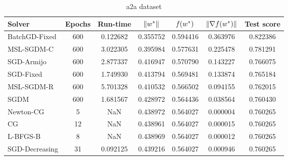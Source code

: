 \begin{table}
\caption{a2a dataset}
\label{tab:a2a-tab}
\centering
\begin{tabular}{lS[drop-zero-decimal]S[round-precision=4]S[round-precision=6]S[round-precision=6]S[exponent-mode=scientific]S[round-precision=6]}
\toprule
Solver & {Epochs} & {Run-time} & {$\lVert w^\ast\rVert$} & {$\operatorname*{\mathit{f}}(w^\ast)$} & {$\lVert\nabla f(w^\ast)\rVert$} & {Test score} \\
\midrule
BatchGD-Fixed & 600 & 0.122682 & 0.355752 & 0.594416 & 0.363976 & 0.822386 \\
MSL-SGDM-C & 600 & 3.022305 & 0.395984 & 0.577631 & 0.225478 & 0.781291 \\
SGD-Armijo & 600 & 2.877337 & 0.416947 & 0.570790 & 0.143227 & 0.766075 \\
SGD-Fixed & 600 & 1.749930 & 0.413794 & 0.569481 & 0.133874 & 0.765184 \\
MSL-SGDM-R & 600 & 5.701328 & 0.410532 & 0.566502 & 0.094155 & 0.762015 \\
SGDM & 600 & 1.681567 & 0.428972 & 0.564436 & 0.038564 & 0.760430 \\
Newton-CG & 5 & NaN & 0.438972 & 0.564027 & 0.000004 & 0.760265 \\
CG & 12 & NaN & 0.438961 & 0.564027 & 0.000015 & 0.760265 \\
L-BFGS-B & 8 & NaN & 0.438969 & 0.564027 & 0.000012 & 0.760265 \\
SGD-Decreasing & 31 & 0.092125 & 0.439216 & 0.564027 & 0.000946 & 0.760265 \\
\bottomrule
\end{tabular}
\end{table}

